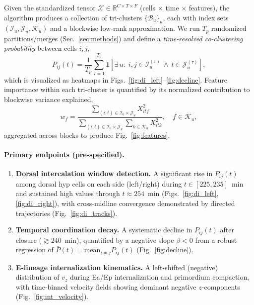 \documentclass[unnumsec,webpdf,modern,large,namedate]{oup-authoring-template}%
\theoremstyle{thmstyleone}\newtheorem{theorem}{Theorem}
\theoremstyle{thmstyletwo}\newtheorem{example}{Example}
\theoremstyle{thmstylethree}\newtheorem{definition}{Definition}
\begin{document}
Given the standardized tensor $\mathcal{X}\in\mathbb{R}^{C\times T\times F}$ (cells $\times$ time $\times$ features), the algorithm produces a collection of tri-clusters $\{\mathcal{B}_u\}_u$, each with index sets $(\mathcal{I}_u,\mathcal{J}_u,\mathcal{K}_u)$ and a blockwise low-rank approximation. We run $T_p$ randomized partitions/merges (Sec.~\ref{sec:methods}) and define a \emph{time-resolved co-clustering probability} between cells $i,j$,
\begin{equation}
P_{ij}(t)=\frac{1}{T_p}\sum_{\tau=1}^{T_p}\mathbf{1}\!\left[\exists\,u:\; i,j\in\mathcal{I}_u^{(\tau)}\ \wedge\ t\in\mathcal{J}_u^{(\tau)}\right],
\label{eq:coclust_prob}
\end{equation}
which is visualized as heatmaps in Figs.~\ref{fig:di_left}--\ref{fig:decline}. Feature importance within each tri-cluster is quantified by its normalized contribution to blockwise variance explained,
\begin{equation}
w_f = \frac{\sum_{(i,t)\in\mathcal{I}_u\times\mathcal{J}_u} X_{itf}^2}{\sum_{(i,t)\in\mathcal{I}_u\times\mathcal{J}_u}\sum_{k\in\mathcal{K}_u} X_{itk}^2},\quad f\in\mathcal{K}_u,
\label{eq:feature_weight}
\end{equation}
aggregated across blocks to produce Fig.~\ref{fig:features}.

\paragraph{Primary endpoints (pre-specified).}
\begin{enumerate}
\item \textbf{Dorsal intercalation window detection.} A significant rise in $P_{ij}(t)$ among dorsal hyp cells on each side (left/right) during $t\in[225,235]$~min and sustained high values through $t\approx 254$~min (Figs.~\ref{fig:di_left},\ref{fig:di_right}), with cross-midline convergence demonstrated by directed trajectories (Fig.~\ref{fig:di_tracks}).
\item \textbf{Temporal coordination decay.} A systematic decline in $P_{ij}(t)$ after closure ($\gtrsim 240$~min), quantified by a negative slope $\beta<0$ from a robust regression of $\bar{P}(t)=\mathrm{mean}_{i\neq j}P_{ij}(t)$ (Fig.~\ref{fig:decline}).
\item \textbf{E-lineage internalization kinematics.} A left-shifted (negative) distribution of $v_z$ during Ea/Ep internalization and primordium compaction, with time-binned velocity fields showing dominant negative $z$-components (Fig.~\ref{fig:int_velocity}).
\end{enumerate}
\end{document}
